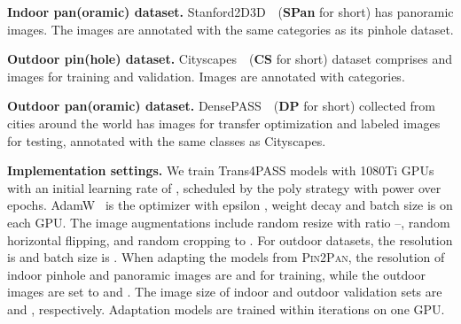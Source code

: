 \documentclass[final]{cvpr}
\begin{document}
\noindent\textbf{Indoor pan(oramic) dataset.}
Stanford2D3D~\cite{stanford2d3d}~(\textbf{SPan} for short) has  panoramic images. The images are annotated with the same  categories as its pinhole dataset.

\noindent\textbf{Outdoor pin(hole) dataset.}
Cityscapes~\cite{cityscapes}~(\textbf{CS} for short) dataset comprises  and  images for training and validation. Images are annotated with  categories.

\noindent\textbf{Outdoor pan(oramic) dataset.}
DensePASS~\cite{densepass}~(\textbf{DP} for short) collected from cities around the world has  images for transfer optimization and  labeled images for testing, annotated with the same  classes as Cityscapes.


\noindent\textbf{Implementation settings.}
We train Trans4PASS models with  1080Ti GPUs with an initial learning rate of , scheduled by the poly strategy with power  over  epochs. AdamW~\cite{adam} is the optimizer with epsilon , weight decay  and batch size is  on each GPU. The image augmentations include random resize with ratio {--}, random horizontal flipping, and random cropping to . For outdoor datasets, the resolution is  and batch size is . When adapting the models from \textsc{Pin2Pan}, the resolution of indoor pinhole and panoramic images are  and  for training, while the outdoor images are set to  and . The image size of indoor and outdoor validation sets are  and , respectively. Adaptation models are trained within  iterations on one GPU.
\end{document}
